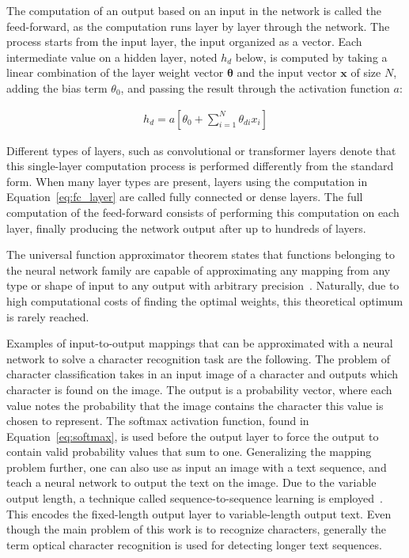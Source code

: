 \documentclass[english,twoside,openright]{UH_DS_MSc}
\begin{document}
The computation of an output based on an input in the network is called the 
feed-forward, as the computation runs layer by layer through the 
network. The process starts from the input layer, the input 
organized as a vector. Each intermediate value on a hidden layer, noted $h_d$ below,
is computed by taking a linear combination of the layer weight vector $\mathbf{\theta}$ and 
the input vector $\mathbf{x}$ of size $N$, adding the 
bias term $\theta_0$, and passing the result through the activation function $a$:

\begin{align}
    h_d = a\left[ \theta_{0} + \sum_{i=1}^{N}\theta_{di}x_{i} \right]
\label{eq:fc_layer}
\end{align}

Different types of layers, such as convolutional or transformer layers 
denote that this single-layer computation process is performed differently from 
the standard form. When many layer types are present, layers using the computation
in Equation~\ref{eq:fc_layer} are called fully connected or dense layers. The full computation of 
the feed-forward consists of performing this computation on each layer, finally producing the 
network output after up to hundreds of layers.

The universal function approximator theorem states that functions belonging to the 
neural network family are capable of approximating any mapping from any type or shape of input
to any output with arbitrary precision~\cite{princebook}. Naturally, due to high computational 
costs of finding the optimal weights,
this theoretical optimum is rarely reached.

Examples of input-to-output mappings that can be approximated with a neural network to solve a character recognition task are the following. The problem of character classification takes in an input image of a character and outputs which character is found on the image. The output is a probability vector, where each value notes the probability that the image contains the character this value is chosen to represent. The softmax activation function, found in Equation~\ref{eq:softmax}, is used before the output layer to force the output to contain valid probability values that sum to one. Generalizing the mapping problem further, one can also use as input an image 
with a text sequence, and teach a neural network to output the text on the image.
Due to the variable output length, a technique called sequence-to-sequence learning 
is employed~\cite{sutskever2014sequence}. This encodes the fixed-length output layer to variable-length 
output text. Even though the main problem of this work is to recognize characters, 
generally the term optical character recognition is used for detecting longer text sequences.
\end{document}
